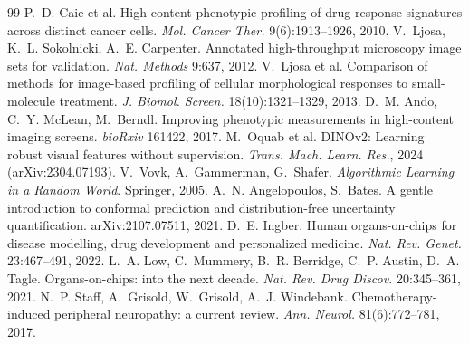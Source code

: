 \documentclass[11pt,a4paper]{article}
\begin{document}
\begin{thebibliography}{99}\small
{} P.~D. Caie et al. High-content phenotypic profiling of drug response signatures across distinct cancer cells. \emph{Mol. Cancer Ther.} 9(6):1913--1926, 2010.
 V.~Ljosa, K.~L. Sokolnicki, A.~E. Carpenter. Annotated high-throughput microscopy image sets for validation. \emph{Nat. Methods} 9:637, 2012.
 V.~Ljosa et al. Comparison of methods for image-based profiling of cellular morphological responses to small-molecule treatment. \emph{J. Biomol. Screen.} 18(10):1321--1329, 2013.
 D.~M. Ando, C.~Y. McLean, M.~Berndl. Improving phenotypic measurements in high-content imaging screens. \emph{bioRxiv} 161422, 2017.
 M.~Oquab et al. DINOv2: Learning robust visual features without supervision. \emph{Trans. Mach. Learn. Res.}, 2024 (arXiv:2304.07193).
 V.~Vovk, A.~Gammerman, G.~Shafer. \emph{Algorithmic Learning in a Random World}. Springer, 2005.
 A.~N. Angelopoulos, S.~Bates. A gentle introduction to conformal prediction and distribution-free uncertainty quantification. arXiv:2107.07511, 2021.
 D.~E. Ingber. Human organs-on-chips for disease modelling, drug development and personalized medicine. \emph{Nat. Rev. Genet.} 23:467--491, 2022.
 L.~A. Low, C.~Mummery, B.~R. Berridge, C.~P. Austin, D.~A. Tagle. Organs-on-chips: into the next decade. \emph{Nat. Rev. Drug Discov.} 20:345--361, 2021.
 N.~P. Staff, A.~Grisold, W.~Grisold, A.~J. Windebank. Chemotherapy-induced peripheral neuropathy: a current review. \emph{Ann. Neurol.} 81(6):772--781, 2017.
\end{thebibliography}
\end{document}
